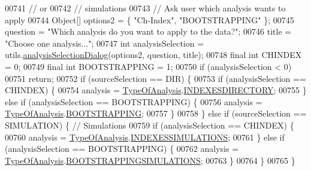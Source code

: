 \begin{DoxyCode}
{00741                                                                          \textcolor{comment}{// or}
00742                                                                          \textcolor{comment}{// simulations}
00743       \textcolor{comment}{// Ask user which analysis wants to apply}
00744       Object[] options2 = \{ \textcolor{stringliteral}{"Ch-Index"}, \textcolor{stringliteral}{"BOOTSTRAPPING"} \};
00745       question = \textcolor{stringliteral}{"Which analysis do you want to apply to the data?"};
00746       title = \textcolor{stringliteral}{"Choose one analysis..."};
00747       \textcolor{keywordtype}{int} analysisSelection = utils.\hyperlink{classfunctions_1_1_utils_a0e53c856e8bb35342f949c2f320d0e74}{analysisSelectionDialog}(options2, question, 
      title);
00748       \textcolor{keyword}{final} \textcolor{keywordtype}{int} CHINDEX = 0;
00749       \textcolor{keyword}{final} \textcolor{keywordtype}{int} BOOTSTRAPPING = 1;
00750       \textcolor{keywordflow}{if} (analysisSelection < 0)
00751         \textcolor{keywordflow}{return};
00752       \textcolor{keywordflow}{if} (sourceSelection == DIR) \{
00753         \textcolor{keywordflow}{if} (analysisSelection == CHINDEX) \{
00754           analysis = \hyperlink{enumanalysis_1_1_chemotaxis_1_1_type_of_analysis}{TypeOfAnalysis}.\hyperlink{enumanalysis_1_1_chemotaxis_1_1_type_of_analysis_aea93300e25d2c79a263d702652974555}{INDEXESDIRECTORY};
00755         \} \textcolor{keywordflow}{else} \textcolor{keywordflow}{if} (analysisSelection == BOOTSTRAPPING) \{
00756           analysis = \hyperlink{enumanalysis_1_1_chemotaxis_1_1_type_of_analysis}{TypeOfAnalysis}.\hyperlink{enumanalysis_1_1_chemotaxis_1_1_type_of_analysis_ad9b1fe1a91148ef56f2b25bb3578764f}{BOOTSTRAPPING};
00757         \}
00758       \} \textcolor{keywordflow}{else} \textcolor{keywordflow}{if} (sourceSelection == SIMULATION) \{ \textcolor{comment}{// Simulations}
00759         \textcolor{keywordflow}{if} (analysisSelection == CHINDEX) \{
00760           analysis = \hyperlink{enumanalysis_1_1_chemotaxis_1_1_type_of_analysis}{TypeOfAnalysis}.\hyperlink{enumanalysis_1_1_chemotaxis_1_1_type_of_analysis_a8c82f8309b37b928874804133c555393}{INDEXESSIMULATIONS};
00761         \} \textcolor{keywordflow}{else} \textcolor{keywordflow}{if} (analysisSelection == BOOTSTRAPPING) \{
00762           analysis = \hyperlink{enumanalysis_1_1_chemotaxis_1_1_type_of_analysis}{TypeOfAnalysis}.\hyperlink{enumanalysis_1_1_chemotaxis_1_1_type_of_analysis_a7520eb9cb2be4df8fff8c63292caed13}{BOOTSTRAPPINGSIMULATIONS};
00763         \}
00764       \}
00765     \}
}
\end{DoxyCode}

